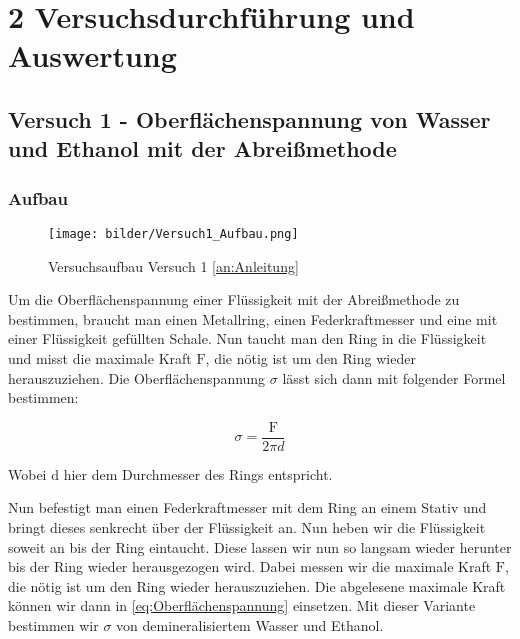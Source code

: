 \chapter*{2 Versuchsdurchführung und Auswertung}
\setcounter{chapter}{2}
\setcounter{section}{0}
\setcounter{subsection}{0}
 
    \section{Versuch 1 - Oberflächenspannung von Wasser und Ethanol mit der Abreißmethode}
    \label{sec:Versuch1}
        
        \subsection{Aufbau}

            \begin{figure}[H]
                \centering
                \texttt{[image: bilder/Versuch1\_Aufbau.png]}
                \caption{Versuchsaufbau Versuch 1 \ref{an:Anleitung}}
                \label{fig:Versuch1_Aufbau}
            \end{figure}

            Um die Oberflächenspannung einer Flüssigkeit mit der Abreißmethode zu bestimmen,
            braucht man einen Metallring, einen Federkraftmesser und eine mit einer Flüssigkeit gefüllten Schale. Nun taucht man den Ring in die Flüssigkeit und misst die maximale Kraft $\mathrm{F}$, die nötig ist um den Ring wieder herauszuziehen. Die Oberflächenspannung $\sigma$ lässt sich dann mit folgender Formel bestimmen:

            \begin{equation}
                \sigma = \frac{\mathrm{F}}{2\pi d}
                \label{eq:Oberflächenspannung}
            \end{equation}

            Wobei $\mathrm{d}$ hier dem Durchmesser des Rings entspricht.
            
            Nun befestigt man einen Federkraftmesser mit dem Ring an einem Stativ und bringt dieses senkrecht über der Flüssigkeit an. Nun heben wir die Flüssigkeit soweit an bis der Ring eintaucht. Diese lassen wir nun so langsam wieder herunter bis der Ring wieder herausgezogen wird. Dabei messen wir die maximale Kraft $\mathrm{F}$, die nötig ist um den Ring wieder herauszuziehen. Die abgelesene maximale Kraft können wir dann in \ref{eq:Oberflächenspannung} einsetzen. Mit dieser Variante bestimmen wir $\sigma$ von demineralisiertem Wasser und Ethanol.

